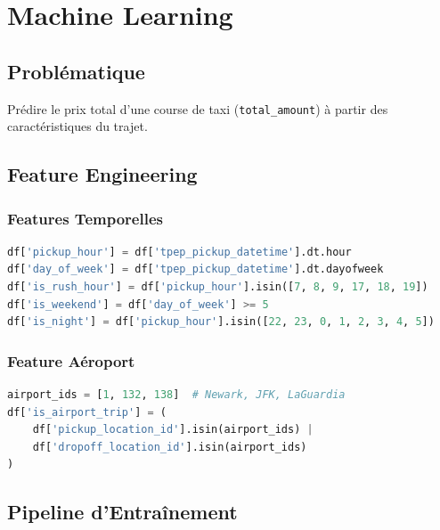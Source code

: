 \documentclass[12pt,a4paper]{report}
\begin{document}
\chapter{Machine Learning}

\section{Problématique}

Prédire le prix total d'une course de taxi (\texttt{total\_amount}) à partir des caractéristiques du trajet.

\section{Feature Engineering}

\subsection{Features Temporelles}

\begin{lstlisting}[language=Python, caption=Création des features temporelles]
df['pickup_hour'] = df['tpep_pickup_datetime'].dt.hour
df['day_of_week'] = df['tpep_pickup_datetime'].dt.dayofweek
df['is_rush_hour'] = df['pickup_hour'].isin([7, 8, 9, 17, 18, 19])
df['is_weekend'] = df['day_of_week'] >= 5
df['is_night'] = df['pickup_hour'].isin([22, 23, 0, 1, 2, 3, 4, 5])
\end{lstlisting}

\subsection{Feature Aéroport}

\begin{lstlisting}[language=Python, caption=Detection des trajets aeroport]
airport_ids = [1, 132, 138]  # Newark, JFK, LaGuardia
df['is_airport_trip'] = (
    df['pickup_location_id'].isin(airport_ids) |
    df['dropoff_location_id'].isin(airport_ids)
)
\end{lstlisting}

\section{Pipeline d'Entraînement}
\end{document}
